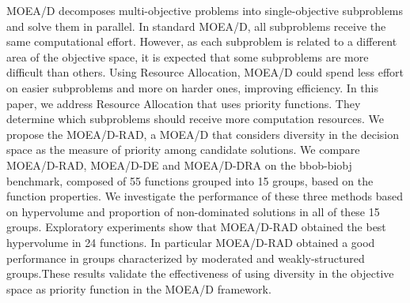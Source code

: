 MOEA/D decomposes multi-objective problems into single-objective subproblems and solve them in parallel. In standard MOEA/D, all subproblems receive the same computational effort. However, as each subproblem is related to a different area of the objective space, it is expected that some subproblems are more difficult than others. Using Resource Allocation, MOEA/D could spend less effort on easier subproblems and more on harder ones, improving efficiency. In this paper, we address Resource Allocation that uses priority functions. They determine which subproblems should receive more computation resources. We propose the MOEA/D-RAD, a MOEA/D that considers diversity in the decision space as the measure of priority among candidate solutions. We compare MOEA/D-RAD, MOEA/D-DE and MOEA/D-DRA on the bbob-biobj benchmark, composed of 55 functions grouped into 15 groups, based on the function properties. We investigate the performance of these three methods based on hypervolume and proportion of non-dominated solutions in all of these 15 groups. Exploratory experiments show that MOEA/D-RAD obtained the best hypervolume in 24 functions. In particular MOEA/D-RAD obtained a good performance in groups characterized by moderated and weakly-structured groups.These results validate the effectiveness of using diversity in the objective space as priority function in the MOEA/D framework.